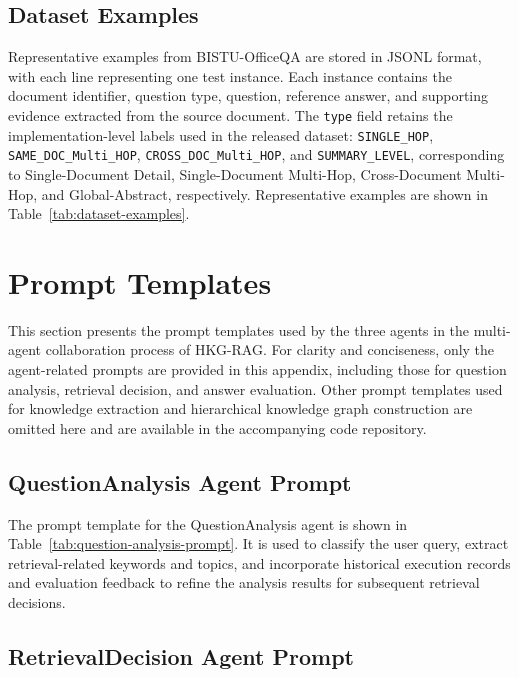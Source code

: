\documentclass[preprint,12pt,authoryear]{elsarticle}
\begin{document}
\subsection{Dataset Examples}

Representative examples from BISTU-OfficeQA are stored in JSONL format, with each line representing one test instance. Each instance contains the document identifier, question type, question, reference answer, and supporting evidence extracted from the source document. The \texttt{type} field retains the implementation-level labels used in the released dataset: \texttt{SINGLE\_HOP}, \texttt{SAME\_DOC\_Multi\_HOP}, \texttt{CROSS\_DOC\_Multi\_HOP}, and \texttt{SUMMARY\_LEVEL}, corresponding to Single-Document Detail, Single-Document Multi-Hop, Cross-Document Multi-Hop, and Global-Abstract, respectively. Representative examples are shown in Table~\ref{tab:dataset-examples}.


\FloatBarrier

\section{Prompt Templates}
\label{app:prompts}

This section presents the prompt templates used by the three agents in the multi-agent collaboration process of HKG-RAG. For clarity and conciseness, only the agent-related prompts are provided in this appendix, including those for question analysis, retrieval decision, and answer evaluation. Other prompt templates used for knowledge extraction and hierarchical knowledge graph construction are omitted here and are available in the accompanying code repository.

\subsection{QuestionAnalysis Agent Prompt}
The prompt template for the QuestionAnalysis agent is shown in Table~\ref{tab:question-analysis-prompt}. It is used to classify the user query, extract retrieval-related keywords and topics, and incorporate historical execution records and evaluation feedback to refine the analysis results for subsequent retrieval decisions.



\subsection{RetrievalDecision Agent Prompt}
\end{document}

